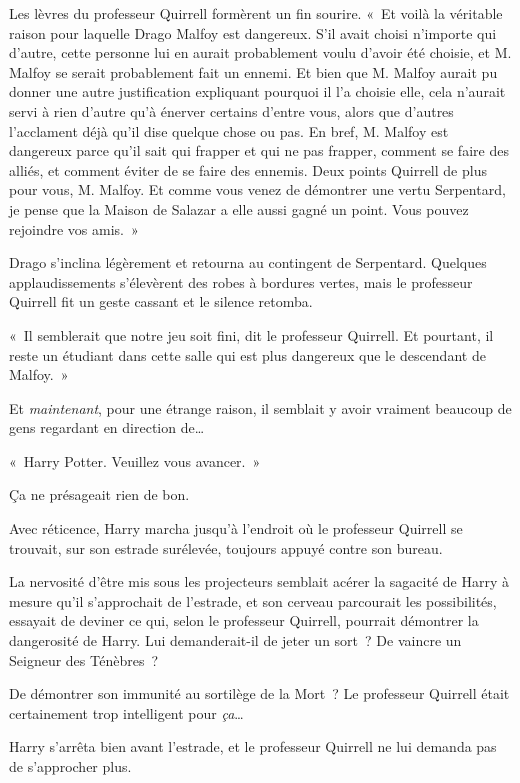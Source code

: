 Les lèvres du professeur Quirrell formèrent un fin sourire. «~Et voilà la véritable raison pour laquelle Drago Malfoy est dangereux. S'il avait choisi n'importe qui d'autre, cette personne lui en aurait probablement voulu d'avoir été choisie, et M. Malfoy se serait probablement fait un ennemi. Et bien que M. Malfoy aurait pu donner une autre justification expliquant pourquoi il l'a choisie elle, cela n'aurait servi à rien d'autre qu'à énerver certains d'entre vous, alors que d'autres l'acclament déjà qu'il dise quelque chose ou pas. En bref, M. Malfoy est dangereux parce qu'il sait qui frapper et qui ne pas frapper, comment se faire des alliés, et comment éviter de se faire des ennemis. Deux points Quirrell de plus pour vous, M. Malfoy. Et comme vous venez de démontrer une vertu Serpentard, je pense que la Maison de Salazar a elle aussi gagné un point. Vous pouvez rejoindre vos amis.~»

Drago s'inclina légèrement et retourna au contingent de Serpentard. Quelques applaudissements s'élevèrent des robes à bordures vertes, mais le professeur Quirrell fit un geste cassant et le silence retomba.

«~Il semblerait que notre jeu soit fini, dit le professeur Quirrell. Et pourtant, il reste un étudiant dans cette salle qui est plus dangereux que le descendant de Malfoy.~»

Et \emph{maintenant}, pour une étrange raison, il semblait y avoir vraiment beaucoup de gens regardant en direction de…

«~Harry Potter. Veuillez vous avancer.~»

Ça ne présageait rien de bon.

Avec réticence, Harry marcha jusqu'à l'endroit où le professeur Quirrell se trouvait, sur son estrade surélevée, toujours appuyé contre son bureau.

La nervosité d'être mis sous les projecteurs semblait acérer la sagacité de Harry à mesure qu'il s'approchait de l'estrade, et son cerveau parcourait les possibilités, essayait de deviner ce qui, selon le professeur Quirrell, pourrait démontrer la dangerosité de Harry. Lui demanderait-il de jeter un sort~? De vaincre un Seigneur des Ténèbres~?

De démontrer son immunité au sortilège de la Mort~? Le professeur Quirrell était certainement trop intelligent pour \emph{ça}…

Harry s'arrêta bien avant l'estrade, et le professeur Quirrell ne lui demanda pas de s'approcher plus.

